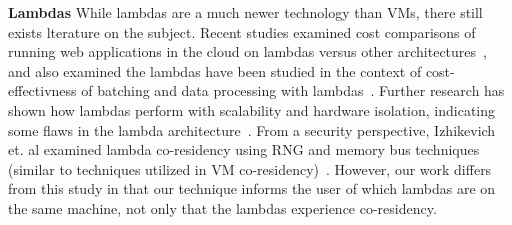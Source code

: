 \textbf{Lambdas} 
While lambdas are a much newer technology than VMs, there still exists lterature
on the subject. Recent studies examined cost comparisons of running web
applications in the cloud on lambdas versus other
architectures~\cite{villamizar2016}, and also examined the lambdas have been
studied in the context of cost-effectivness of batching and data processing with
lambdas~\cite{kiran2015}.  Further research has shown how lambdas perform with
scalability and hardware isolation, indicating some flaws in the lambda
architecture~\cite{wangusenix2018}. From a security perspective, Izhikevich et.
al examined lambda co-residency using RNG and memory bus techniques (similar to
techniques utilized in VM co-residency)~\cite{izhikevich2018}. However, our work
differs from this study in that our technique informs the user of which lambdas
are on the same machine, not only that the lambdas experience co-residency.
